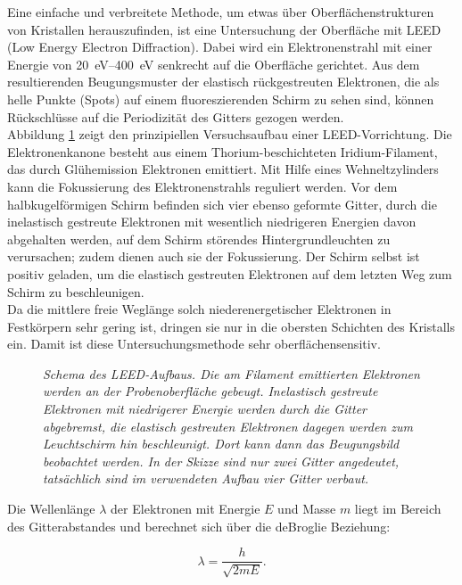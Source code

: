 \FloatBarrier

Eine einfache und verbreitete Methode, um etwas über Oberflächenstrukturen von
 Kristallen herauszufinden, ist eine Untersuchung der Oberfläche mit LEED (Low Energy Electron
 Diffraction).
 Dabei wird ein Elektronenstrahl mit einer Energie von \SIrange{20}{400}{eV} senkrecht auf die
 Oberfläche gerichtet. Aus dem resultierenden
 Beugungsmuster der elastisch rückgestreuten Elektronen, die als helle Punkte (Spots) auf einem 
 fluoreszierenden Schirm zu sehen sind, können Rückschlüsse auf die Periodizität des Gitters gezogen werden.
 \\
  Abbildung \ref{leedaufbau} zeigt den prinzipiellen Versuchsaufbau einer LEED-Vorrichtung. Die
 Elektronenkanone besteht aus einem Thorium-beschichteten Iridium-Filament, das durch Glühemission
 Elektronen emittiert. Mit Hilfe eines Wehneltzylinders kann die Fokussierung
 des Elektronenstrahls reguliert werden. Vor dem halbkugelförmigen Schirm befinden
 sich vier ebenso geformte Gitter, durch die inelastisch gestreute Elektronen mit wesentlich
 niedrigeren Energien davon abgehalten werden, auf dem Schirm störendes Hintergrundleuchten zu
 verursachen; zudem dienen auch sie der Fokussierung. Der Schirm selbst ist positiv geladen, um
 die elastisch gestreuten Elektronen auf dem letzten Weg zum Schirm zu beschleunigen.
 \\
  Da die mittlere freie Weglänge solch niederenergetischer Elektronen in
 Festkörpern sehr gering ist, dringen sie nur in die obersten Schichten des
 Kristalls ein. Damit ist diese Untersuchungsmethode sehr oberflächensensitiv.

 \begin{figure}[htbp]
	\centering
	\sffamily 
	
	\caption{\textit{Schema des LEED-Aufbaus. Die am Filament emittierten Elektronen werden an der
	Probenoberfläche gebeugt. Inelastisch gestreute Elektronen mit niedrigerer Energie werden durch die
	Gitter abgebremst, die elastisch gestreuten Elektronen dagegen werden zum Leuchtschirm
	hin beschleunigt. Dort kann dann das Beugungsbild beobachtet werden. In der Skizze sind nur zwei
	Gitter angedeutet, tatsächlich sind im verwendeten Aufbau vier Gitter verbaut.}}
	\label{leedaufbau}
\end{figure}

 Die Wellenlänge $\lambda$ der Elektronen mit Energie $E$ und Masse $m$ liegt im Bereich des
 Gitterabstandes und berechnet sich über die deBroglie Beziehung:
 
 \[\lambda=\frac{h}{\sqrt{2mE}}.\]%
 
